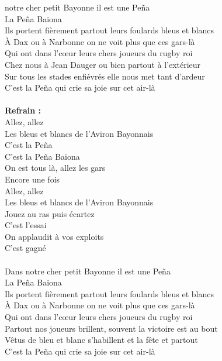
 notre cher petit Bayonne il est une Peña
\\La Peña Baiona
\\Ils portent fièrement partout leurs foulards bleus et blancs
\\À Dax ou à Narbonne on ne voit plus que ces gars-là
\\Qui ont dans l'cœur leurs chers joueurs du rugby roi
\\Chez nous à Jean Dauger ou bien partout à l'extérieur
\\Sur tous les stades enfiévrés elle nous met tant d'ardeur
\\C'est la Peña qui crie sa joie sur cet air-là
\\\\\textbf{Refrain :}
\\Allez, allez
\\Les bleus et blancs de l'Aviron Bayonnais
\\C'est la Peña
\\C'est la Peña Baiona
\\On est tous là, allez les gars
\\Encore une fois
\\Allez, allez
\\Les bleus et blancs de l'Aviron Bayonnais
\\Jouez au ras puis écartez
\\C'est l'essai
\\On applaudit à vos exploits
\\C'est gagné
\\\\Dans notre cher petit Bayonne il est une Peña
\\La Peña Baiona
\\Ils portent fièrement partout leurs foulards bleus et blancs
\\À Dax ou à Narbonne on ne voit plus que ces gars-là
\\Qui ont dans l'cœur leurs chers joueurs du rugby roi
\\Partout nos joueurs brillent, souvent la victoire est au bout
\\Vêtus de bleu et blanc s'habillent et la fête et partout
\\C'est la Peña qui crie sa joie sur cet air-là

\breakpage
